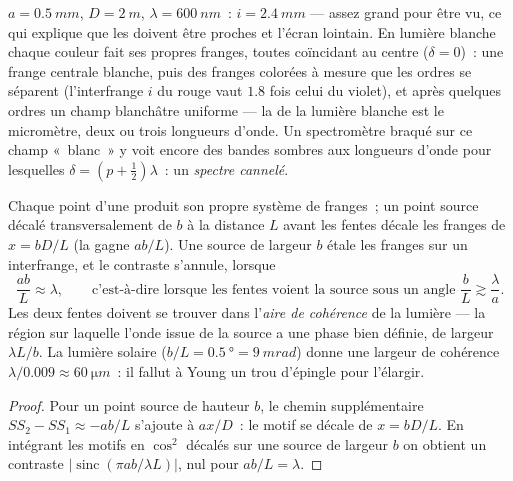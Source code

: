 \begin{example}\label{ex:b2:two-wave-interference:numbers}
$a = \qty{0.5}{mm}$, $D = \qty{2}{m}$, $\lambda = \qty{600}{nm}$~: $i = \qty{2.4}{mm}$ --- assez
grand pour être vu, ce qui explique que les  doivent être proches et l'écran
lointain. En lumière blanche chaque couleur fait ses propres franges, toutes
coïncidant au centre ($\delta = 0$)~: une frange centrale blanche, puis des
franges colorées à mesure que les ordres se séparent (l'interfrange $i$ du rouge vaut $1.8$ fois celui du
violet), et après quelques ordres un champ blanchâtre uniforme --- la
 de la lumière blanche est le micromètre, deux ou trois
longueurs d'onde. Un spectromètre braqué sur ce champ «~blanc~» y voit encore
des bandes sombres aux longueurs d'onde pour lesquelles $\delta = (p + \tfrac12)\lambda$~: un
\emph{spectre cannelé}.
\end{example}

\begin{proposition}\label{prop:b2:two-wave-interference:spatial}
Chaque point d'une  produit son propre système de franges~; un
point source décalé transversalement de $b$ à la distance $L$ avant
les fentes décale les franges de $x = bD/L$ (la  gagne
$ab/L$). Une source de largeur $b$ étale les franges sur un interfrange,
et le contraste s'annule, lorsque
\[
\frac{ab}L \approx \lambda , \qquad\text{c'est-à-dire lorsque les fentes voient la source sous un angle } \frac bL \gtrsim \frac\lambda a .
\]
Les deux fentes doivent se trouver dans l'\emph{aire de cohérence} de la lumière ---
la région sur laquelle l'onde issue de la source a une phase bien définie,
de largeur $\lambda L/b$. La lumière solaire ($b/L = \qty{0.5}{\degree} = \qty{9}{mrad}$)
donne une largeur de cohérence $\lambda/0.009 \approx \qty{60}{\micro m}$~: il fallut à Young un
trou d'épingle pour l'élargir.
\end{proposition}

\begin{proof}
Pour un point source de hauteur $b$, le chemin supplémentaire $SS_2 - SS_1 \approx -ab/L$
s'ajoute à $ax/D$~: le motif se décale de $x = bD/L$. En intégrant les
motifs en $\cos^2$ décalés sur une source de largeur $b$ on obtient un contraste
$|\operatorname{sinc}(\pi ab/\lambda L)|$, nul pour $ab/L = \lambda$.
\end{proof}

